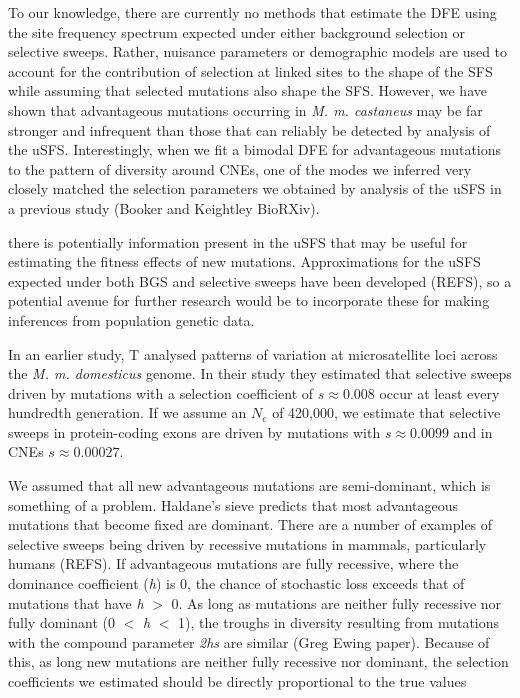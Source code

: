 \documentclass[11pt]{article}
\begin{document}
To our knowledge, there are currently no methods that estimate the DFE using the site frequency spectrum expected under either background selection or selective sweeps. Rather, nuisance parameters or demographic models are used to account for the contribution of selection at linked sites to the shape of the SFS while assuming that selected mutations also shape the SFS. 
However, we have shown that advantageous mutations occurring in \textit{M. m. castaneus} may be far stronger and infrequent than those that can reliably be detected by analysis of the uSFS. Interestingly, when we fit a bimodal DFE for advantageous mutations to the pattern of diversity around CNEs, one of the modes we inferred very closely matched the selection parameters we obtained by analysis of the uSFS in a previous study (Booker and Keightley BioRXiv).

there is potentially information present in the uSFS that may be useful for estimating the fitness effects of new mutations. Approximations for the uSFS expected under both BGS and selective sweeps have been developed (REFS), so a potential avenue for further research would be to incorporate these for making inferences from population genetic data.

In an earlier study, T\cite{RN355} analysed patterns of variation at microsatellite loci across the \textit{M. m. domesticus} genome. In their study they estimated that selective sweeps driven by mutations with a selection coefficient of $s \approx 0.008$ occur at least every hundredth generation. If we assume an $N_e$ of 420,000, we estimate that selective sweeps in protein-coding exons are driven by mutations with $s \approx 0.0099$ and in CNEs $s \approx 0.00027$.

We assumed that all new advantageous mutations are semi-dominant, which is something of a problem. Haldane's sieve predicts that most advantageous mutations that become fixed are dominant. There are a number of examples of selective sweeps being driven by recessive mutations in mammals, particularly humans (REFS). If advantageous mutations are fully recessive, where the dominance coefficient (\textit{h}) is 0, the chance of stochastic loss exceeds that of mutations that have \textit{h} $>$ 0. As long as mutations are neither fully recessive nor fully dominant (0 $<$ \textit{h} $<$ 1), the troughs in diversity resulting from mutations with the compound parameter \textit{2hs} are similar (Greg Ewing paper). Because of this, as long new mutations are neither fully recessive nor dominant, the selection coefficients we estimated should be directly proportional to the true values
\end{document}
